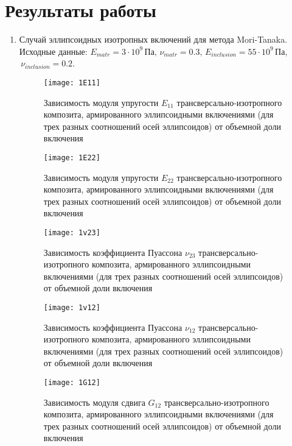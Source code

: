 \documentclass[12pt, a4paper]{article}
\begin{document}
\section{Результаты работы}
\begin{enumerate}
	\item Случай эллипсоидных изотропных включений  для метода Mori-Tanaka. Исходные данные: $ E_{matr} = 3\cdot10^9\,$Па$,\, \nu_{matr} = 0.3,\, E_{inclusion} = 55\cdot10^9\,$Па, $\, \nu_{inclusion} = 0.2$.
	\begin{figure}[h!]
		\centering
		\texttt{[image: 1E11]}
		
		\caption{Зависимость модуля упругости $E_{11}$ трансверсально-изотропного композита, армированного эллипсоидными включениями (для трех разных соотношений осей эллипсоидов) от объемной доли включения}
	\end{figure}

\begin{figure}[h!]
	\centering
	\texttt{[image: 1E22]}
	
	\caption{Зависимость модуля упругости $E_{22}$ трансверсально-изотропного композита, армированного эллипсоидными включениями (для трех разных соотношений осей эллипсоидов) от объемной доли включения}
\end{figure}

\newpage

\begin{figure}[h!]
	\centering
	\texttt{[image: 1v23]}
	
	\caption{ Зависимость коэффициента Пуассона $\nu_{23}$ трансверсально-изотропного композита, армированного эллипсоидными включениями (для трех разных соотношений осей эллипсоидов) от объемной доли включения}
\end{figure}
\begin{figure}[h!]
	\centering
	\texttt{[image: 1v12]}
	
	\caption{Зависимость коэффициента Пуассона $\nu_{12}$ трансверсально-изотропного композита, армированного эллипсоидными включениями (для трех разных соотношений осей эллипсоидов) от объемной доли включения}
\end{figure}
\begin{figure}[h!]
	\centering
	\texttt{[image: 1G12]}
	
	\caption{ Зависимость модуля сдвига $G_{12}$ трансверсально-изотропного композита, армированного эллипсоидными включениями (для трех разных соотношений осей эллипсоидов) от объемной доли включения}
\end{figure}
	

\end{enumerate}
\end{document}
